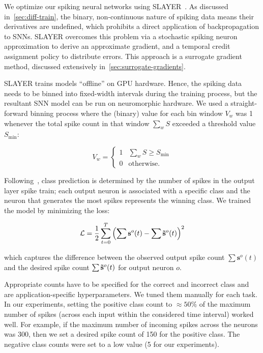 \documentclass[fyp]{socreport}
\begin{document}
We optimize our spiking neural networks using SLAYER~\cite{NIPS2018_7415}. As
discussed in~\autoref{sec:diff-train}, the binary, non-continuous nature of
spiking data means their derivatives are undefined, which prohibits a direct
application of backpropagation to SNNs. SLAYER overcomes this problem via a
stochastic spiking neuron approximation to derive an approximate gradient, and a
temporal credit assignment policy to distribute errors. This approach is a
surrogate gradient method, discussed extensively
in~\autoref{sec:surrogate-gradients}.

SLAYER trains models ``offline'' on GPU hardware. Hence, the spiking data needs
to be binned into fixed-width intervals during the training process, but the
resultant SNN model can be run on neuromorphic hardware. We used a
straight-forward binning process where the (binary) value for each bin window
$V_{w}$ was 1 whenever the total spike count in that window $\sum_{w} S$
exceeded a threshold value $S_{\text{min}}$:

\begin{equation} \label{eqn:bin}
  V_w = \begin{cases}
    1 & \sum_{w} S \ge S_\text{min} \\
    0 & \text{otherwise.}
  \end{cases}
\end{equation}

Following~\cite{NIPS2018_7415}, class prediction is determined by the
number of spikes in the output layer spike train; each output neuron is
associated with a specific class and the neuron that generates the most spikes
represents the winning class. We trained the model by minimizing the loss:

\begin{align}
    \mathcal{L} = \frac{1}{2} \sum_{t=0}^T \left( \sum \mathbf{s}^o(t) - \sum \mathbf{\Tilde{s}}^o(t) \right)^2
\end{align}

which captures the difference between the observed output spike count
$\sum \mathbf{s}^o(t)$ and the desired spike count
$\sum \mathbf{\Tilde{s}}^o(t)$ for output neuron $o$.

Appropriate counts have to be specified for the correct and incorrect class and
are application-specific hyperparameters. We tuned them manually for each task.
In our experiments, setting the positive class count to $\approx 50\%$ of the
maximum number of spikes (across each input within the considered time interval)
worked well. For example, if the maximum number of incoming spikes across the
neurons was 300, then we set a desired spike count of 150 for the positive
class. The negative class counts were set to a low value (5 for our
experiments).
\end{document}
